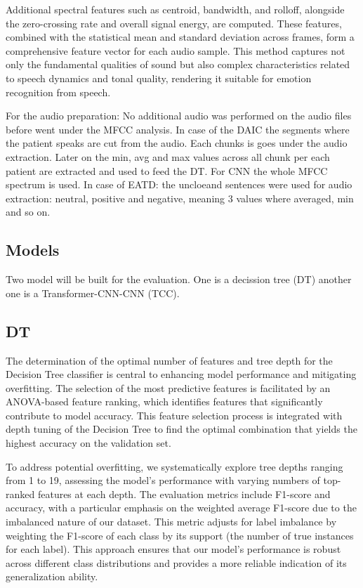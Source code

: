 \begin{table}[H]
Additional spectral features such as centroid, bandwidth, and rolloff, alongside the zero-crossing rate and overall signal energy, are computed. These features, combined with the statistical mean and standard deviation across frames, form a comprehensive feature vector for each audio sample. This method captures not only the fundamental qualities of sound but also complex characteristics related to speech dynamics and tonal quality, rendering it suitable for emotion recognition from speech.

For the audio preparation: No additional audio  was performed on the audio files before went under the MFCC analysis. In case of the DAIC the segments where the patient speaks are cut from the audio. Each chunks is goes under the audio extraction. Later on the min, avg and max values across all chunk per each patient are extracted and used to feed the DT. For CNN the whole MFCC spectrum is used. In case of EATD: the uncloeand sentences were used for audio extraction: neutral, positive and negative, meaning 3 values where averaged, min and so on. 



\subsection{Models}
Two model will be built for the evaluation. One is a decission tree (DT) another one is a Transformer-CNN-CNN (TCC)\cite{yin2023depression}.

\subsection{DT}

The determination of the optimal number of features and tree depth for the Decision Tree classifier is central to enhancing model performance and mitigating overfitting. The selection of the most predictive features is facilitated by an ANOVA-based feature ranking, which identifies features that significantly contribute to model accuracy. This feature selection process is integrated with depth tuning of the Decision Tree to find the optimal combination that yields the highest accuracy on the validation set.

To address potential overfitting, we systematically explore tree depths ranging from 1 to 19, assessing the model's performance with varying numbers of top-ranked features at each depth. The evaluation metrics include F1-score and accuracy, with a particular emphasis on the weighted average F1-score due to the imbalanced nature of our dataset. This metric adjusts for label imbalance by weighting the F1-score of each class by its support (the number of true instances for each label). This approach ensures that our model's performance is robust across different class distributions and provides a more reliable indication of its generalization ability.


\end{table}
